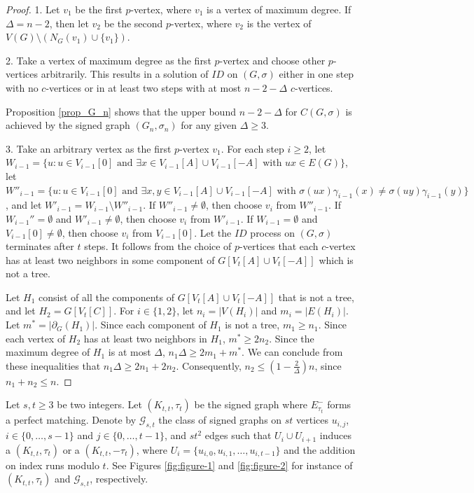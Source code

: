 \documentclass[a4paper,11pt]{article}
\theoremstyle{remark}
\begin{document}
\begin{proof}
1. Let $v_1$ be the first $p$-vertex, where $v_1$ is a vertex of maximum degree. If $\Delta = n - 2$, then let $v_2$ be the second $p$-vertex, where $v_2$ is
the vertex of $V(G) \setminus (N_G(v_1) \cup \{v_1\})$.

2. Take a vertex of maximum degree as the first $p$-vertex and choose other $p$-vertices arbitrarily. This results in a solution of $ID$ on $(G,\sigma)$ either in one step with no $c$-vertices or in at least two steps with at most $n - 2 - \Delta$ $c$-vertices.
    
    Proposition \ref{prop_G_n} shows that the upper bound $n - 2 - \Delta$ for $C(G,\sigma)$ is achieved by the signed graph $(G_n,\sigma_n)$ for any given $\Delta \geq 3$.

3. Take an arbitrary vertex as the first $p$-vertex $v_1$.
For each step $i\geq 2$, let $W_{i-1}=\{u\colon u\in V_{i-1}[0] \text{~and~} \exists x\in V_{i-1}[A]\cup V_{i-1}[-A] \text{~with~} ux\in E(G)\}$,
let $W''_{i-1}=\{u\colon u\in V_{i-1}[0] \text{~and~}\exists x,y\in V_{i-1}[A]\cup V_{i-1}[-A] \text{~with~} \sigma(ux)\gamma_{i-1}(x)\neq \sigma(uy)\gamma_{i-1}(y)\}$,
and let $W'_{i-1}=W_{i-1}\setminus W''_{i-1}$.
If $W''_{i-1}\neq \emptyset$, then choose $v_i$ from $W''_{i-1}$. 
If $W_{i-1}''= \emptyset$ and $W'_{i-1}\neq \emptyset$, then choose $v_i$ from $W'_{i-1}$.
If $W_{i-1}=\emptyset$ and $V_{i-1}[0]\neq \emptyset$, then  choose $v_i$ from $V_{i-1}[0]$.
Let the $ID$ process on $(G,\sigma)$ terminates after $t$ steps.
It follows from the choice of $p$-vertices that 
each $c$-vertex has at least two neighbors in some component of $G[V_{t}[A]\cup V_t[-A]]$ which is not a tree.

Let $H_1$ consist of all the components of $G[V_{t}[A]\cup V_t[-A]]$ that is not a tree, and let $H_2 = G[V_{t}[C]]$.
For $i \in \{1,2\}$,
let $n_i = \vert V(H_i)\vert$ and $m_i = \vert E(H_i)\vert$.  Let $m^* = \vert \partial_G(H_1)\vert$. 
Since each component of $H_1$ is not a tree, $m_1\geq n_1$.
Since each  vertex of $H_2$ has at least two neighbors in $H_1$, $m^*\geq 2n_2$. Since the maximum degree of $H_1$ is at most $\Delta$, $n_1 \Delta  \geq 2m_1+m^*$.
We can conclude from these inequalities that $n_1 \Delta \geq 2n_1+2n_2$. Consequently, $n_2\leq (1-\frac{2}{\Delta})n$, since $n_1+n_2\leq n$.
\end{proof}


Let $s,t\geq 3$ be two integers. Let $(K_{t,t},\tau_t)$ be the signed graph 
where $E^-_{\tau_t}$ forms a perfect matching.
Denote by $\mathcal{G}_{s,t}$ the class of signed graphs on $st$ vertices $u_{i,j}$, 
$i \in \{0, \dots,s-1\}$ and $j \in \{0, \dots,t-1\}$, and
$st^2$ edges such that $U_i\cup U_{i+1}$ induces a $(K_{t,t},\tau_t)$ or a $(K_{t,t},-\tau_t)$, where $U_i=\{u_{i,0},u_{i,1},\ldots,u_{i,t-1}\}$ and the addition on index runs modulo $t$.
See Figures \ref{fig:figure-1} and \ref{fig:figure-2} for instance of $(K_{t,t},\tau_t)$ and $\mathcal{G}_{s,t}$, respectively.
\end{document}
